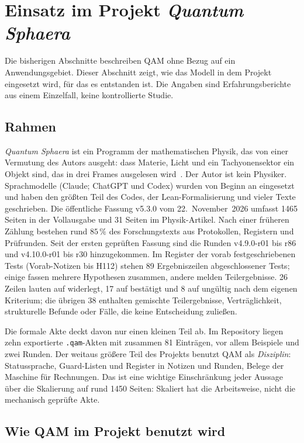 \section{Einsatz im Projekt \emph{Quantum Sphaera}}\label{sec:fallstudie}

Die bisherigen Abschnitte beschreiben QAM ohne Bezug auf ein Anwendungsgebiet. Dieser Abschnitt zeigt, wie das Modell in dem Projekt
eingesetzt wird, für das es entstanden ist. Die Angaben sind Erfahrungsberichte aus einem Einzelfall, keine kontrollierte Studie.

\subsection{Rahmen}

\emph{Quantum Sphaera} ist ein Programm der mathematischen Physik, das von einer Vermutung des Autors ausgeht: dass Materie, Licht und ein
Tachyonensektor ein Objekt sind, das in drei Frames ausgelesen wird~\cite{companion}. Der Autor ist kein Physiker. Sprachmodelle (Claude;
ChatGPT und Codex) wurden von Beginn an eingesetzt und haben den größten Teil des Codes, der Lean-Formalisierung und vieler Texte
geschrieben. Die öffentliche Fassung v5.3.0 vom 22.~November~2026 umfasst 1465 Seiten in der Vollausgabe und 31 Seiten im Physik-Artikel.
Nach einer früheren Zählung bestehen rund \(85\,\%\) des Forschungstexts aus Protokollen, Registern und Prüfrunden. Seit der ersten
geprüften Fassung sind die Runden v4.9.0-r01 bis r86 und v4.10.0-r01 bis r30 hinzugekommen. Im Register der vorab festgeschriebenen Tests
(Vorab-Notizen bis H112) stehen 89 Ergebniszeilen abgeschlossener Tests; einige fassen mehrere Hypothesen zusammen, andere
melden Teilergebnisse. 26 Zeilen lauten auf widerlegt, 17 auf bestätigt und 8 auf ungültig nach dem eigenen Kriterium; die übrigen
38 enthalten gemischte Teilergebnisse, Verträglichkeit, strukturelle Befunde oder Fälle, die keine Entscheidung zuließen.

Die formale Akte deckt davon nur einen kleinen Teil ab. Im Repository liegen zehn exportierte \texttt{.qam}-Akten mit zusammen
81 Einträgen, vor allem Beispiele und zwei Runden. Der weitaus größere Teil des Projekts benutzt QAM als \emph{Disziplin}: Statussprache,
Guard-Listen und Register in Notizen und Runden, Belege der Maschine für Rechnungen. Das ist eine wichtige Einschränkung jeder Aussage
über die \glqq Skalierung\grqq{} auf rund 1450 Seiten: Skaliert hat die Arbeitsweise, nicht die mechanisch geprüfte Akte.

\subsection{Wie QAM im Projekt benutzt wird}

